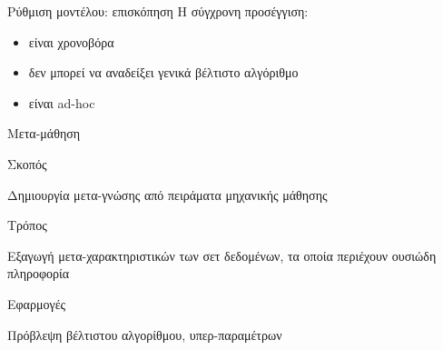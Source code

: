 \documentclass{beamer}
\begin{document}
    \begin{frame} {Ρύθμιση μοντέλου: επισκόπηση}
    Η σύγχρονη προσέγγιση:
    \begin{itemize}
    	\item είναι χρονοβόρα
    	\item δεν μπορεί να αναδείξει γενικά βέλτιστο αλγόριθμο
    	\item είναι ad-hoc
    \end{itemize}
    \end{frame}
  \begin{frame}{Μετα-μάθηση}
  	\begin{minipage}[t]{.3\textwidth}  		
  		Σκοπός
  		\vspace{4ex}
  	\end{minipage}%
  	\begin{minipage}[t]{.6\textwidth}
  		Δημιουργία μετα-γνώσης από πειράματα μηχανικής μάθησης  	
  		\vspace{4ex}
  	\end{minipage}
  	\begin{minipage}[t]{.3\textwidth}  		
  		Τρόπος
  		\vspace{4ex}
  	\end{minipage}%
  	\begin{minipage}[t]{.6\textwidth}
  		Εξαγωγή μετα-χαρακτηριστικών των σετ δεδομένων, τα οποία περιέχουν ουσιώδη πληροφορία
  		\vspace{4ex} 
  	\end{minipage}
  	\begin{minipage}[t]{.3\textwidth}  		
  		Εφαρμογές
  		\vspace{4ex}
  	\end{minipage}%
  	\begin{minipage}[t]{.6\textwidth}
  		Πρόβλεψη βέλτιστου αλγορίθμου, υπερ-παραμέτρων 
  		\vspace{4ex}
  	\end{minipage}
  \end{frame}
\end{document}
